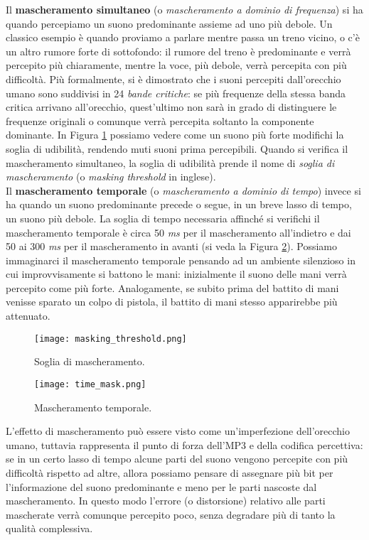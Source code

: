 		Il \textbf{mascheramento simultaneo} (o \textit{mascheramento a dominio di frequenza}) si ha quando percepiamo un suono predominante assieme ad uno più debole. Un classico esempio è quando proviamo a parlare mentre passa un treno vicino, o c'è un altro rumore forte di sottofondo: il rumore del treno è predominante e verrà percepito più chiaramente, mentre la voce, più debole, verrà percepita con più difficoltà. Più formalmente, si è dimostrato che i suoni percepiti dall'orecchio umano sono suddivisi in 24 \textit{bande critiche}: se più frequenze della stessa banda critica arrivano all'orecchio, quest'ultimo non sarà in grado di distinguere le frequenze originali o comunque verrà percepita soltanto la componente dominante. In Figura \ref{fig:masking_threshold} possiamo vedere come un suono più forte modifichi la soglia di udibilità, rendendo muti suoni prima percepibili. Quando si verifica il mascheramento simultaneo, la soglia di udibilità prende il nome di \textit{soglia di mascheramento} (o \textit{masking threshold} in inglese).\\
		Il \textbf{mascheramento temporale} (o \textit{mascheramento a dominio di tempo}) invece si ha quando un suono predominante precede o segue, in un breve lasso di tempo, un suono più debole. La soglia di tempo necessaria affinché si verifichi il mascheramento temporale è circa 50 \textit{ms} per il mascheramento all'indietro e dai 50 ai 300 \textit{ms} per il mascheramento in avanti \cite{raissi} (si veda la Figura \ref{fig:time_mask}). Possiamo immaginarci il mascheramento temporale pensando ad un ambiente silenzioso in cui improvvisamente si battono le mani: inizialmente il suono delle mani verrà percepito come più forte. Analogamente, se subito prima del battito di mani venisse sparato un colpo di pistola, il battito di mani stesso apparirebbe più attenuato.\\
		
		\begin{figure}[h!]
			\centering
				\texttt{[image: masking\_threshold.png]}
			\caption{Soglia di mascheramento.}
			\label{fig:masking_threshold}
		\end{figure}
		
		\begin{figure}[h!]
			\centering
				\texttt{[image: time\_mask.png]}
			\caption{Mascheramento temporale.}
			\label{fig:time_mask}
		\end{figure}
		
		L'effetto di mascheramento può essere visto come un'imperfezione dell'orecchio umano, tuttavia rappresenta il punto di forza dell'MP3 e della codifica percettiva: se in un certo lasso di tempo alcune parti del suono vengono percepite con più difficoltà rispetto ad altre, allora possiamo pensare di assegnare più bit per l'informazione del suono predominante e meno per le parti nascoste dal mascheramento. In questo modo l'errore (o distorsione) relativo alle parti mascherate verrà comunque percepito poco, senza degradare più di tanto la qualità complessiva.
		
		